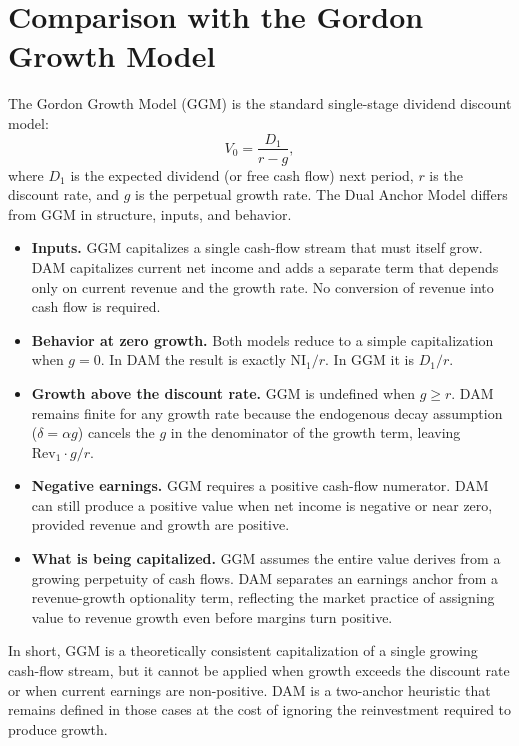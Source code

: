 \documentclass[11pt]{article}
\begin{document}
\section{Comparison with the Gordon Growth Model}
The Gordon Growth Model (GGM) is the standard single-stage dividend discount model:
\begin{equation}
V_0 = \frac{D_1}{r - g},
\end{equation}
where \(D_1\) is the expected dividend (or free cash flow) next period, \(r\) is the discount rate, and \(g\) is the perpetual growth rate. The Dual Anchor Model differs from GGM in structure, inputs, and behavior.

\begin{itemize}[noitemsep]
\item \textbf{Inputs.} GGM capitalizes a single cash-flow stream that must itself grow. DAM capitalizes current net income and adds a separate term that depends only on current revenue and the growth rate. No conversion of revenue into cash flow is required.
\item \textbf{Behavior at zero growth.} Both models reduce to a simple capitalization when \(g = 0\). In DAM the result is exactly \(\mathrm{NI}_1 / r\). In GGM it is \(D_1 / r\).
\item \textbf{Growth above the discount rate.} GGM is undefined when \(g \geq r\). DAM remains finite for any growth rate because the endogenous decay assumption (\(\delta = \alpha g\)) cancels the \(g\) in the denominator of the growth term, leaving \(\mathrm{Rev}_1 \cdot g / r\).
\item \textbf{Negative earnings.} GGM requires a positive cash-flow numerator. DAM can still produce a positive value when net income is negative or near zero, provided revenue and growth are positive.
\item \textbf{What is being capitalized.} GGM assumes the entire value derives from a growing perpetuity of cash flows. DAM separates an earnings anchor from a revenue-growth optionality term, reflecting the market practice of assigning value to revenue growth even before margins turn positive.
\end{itemize}

In short, GGM is a theoretically consistent capitalization of a single growing cash-flow stream, but it cannot be applied when growth exceeds the discount rate or when current earnings are non-positive. DAM is a two-anchor heuristic that remains defined in those cases at the cost of ignoring the reinvestment required to produce growth.
\end{document}
